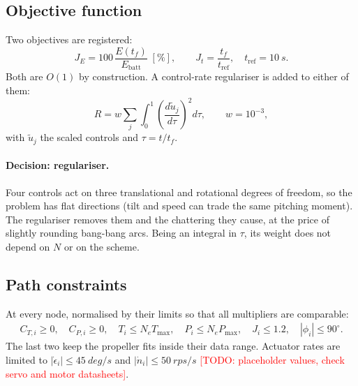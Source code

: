 \documentclass[11pt,a4paper]{article}
\newcommand{\todo}[1]{\textcolor{red}{[TODO: #1]}}
\begin{document}
\subsection{Objective function}
Two objectives are registered:
\begin{equation}
J_E = 100\,\frac{E(t_f)}{E_\text{batt}} \;[\%], \qquad
J_t = \frac{t_f}{t_\text{ref}}, \quad t_\text{ref} = \SI{10}{s}.
\end{equation}
Both are $O(1)$ by construction. A control-rate regulariser is added to either of them:
\begin{equation}
R = w \sum_{j} \int_0^1 \left(\frac{d\tilde u_j}{d\tau}\right)^2 d\tau, \qquad w = 10^{-3},
\end{equation}
with $\tilde u_j$ the scaled controls and $\tau = t/t_f$.

\paragraph{Decision: regulariser.} Four controls act on three translational and rotational
degrees of freedom, so the problem has flat directions (tilt and speed can trade the same pitching moment).
The regulariser removes them and the chattering they cause, at the price of slightly
rounding bang-bang arcs. Being an integral in $\tau$, its weight does not depend on $N$ or on the scheme.

\subsection{Path constraints}
At every node, normalised by their limits so that all multipliers are comparable:
\begin{gather}
C_{T,i} \ge 0, \quad C_{P,i} \ge 0, \quad
T_i \le N_e T_\text{max}, \quad P_i \le N_e P_\text{max}, \quad
J_i \le 1.2, \quad |\phi_i| \le 90^\circ .
\end{gather}
The last two keep the propeller fits inside their data range.
Actuator rates are limited to $|\dot\epsilon_i| \le \SI{45}{deg/s}$ and $|\dot n_i| \le \SI{50}{rps/s}$
\todo{placeholder values, check servo and motor datasheets}.
\end{document}
